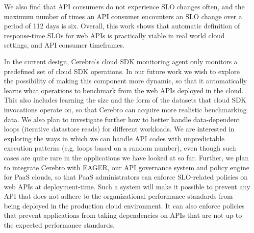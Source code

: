 We also find that API consumers do not experience SLO changes often, and the maximum
number of times an API consumer encounters an SLO change over a period of 112 days is six.
Overall, this work shows that automatic definition of response-time SLOs for web APIs is practically
viable in real world cloud settings, and API consumer timeframes.

In the current design, Cerebro's cloud SDK monitoring agent only monitors 
a predefined set of cloud SDK operations. In our future work we wish 
to explore the possibility of making this component more dynamic,
so that it automatically learns what operations to benchmark from the web APIs 
deployed in the cloud. This also includes learning the size and the form of the datasets
that cloud SDK invocations operate on, so that Cerebro can acquire more realistic
benchmarking data. We also plan to investigate further how to better
handle data-dependent loops (iterative datastore reads) for different workloads. We are interested
in exploring the ways in which we can handle API codes with unpredictable execution patterns (e.g.
loops based on a random number), even though such cases are quite rare in the applications we
have looked at so far.
Further, we plan
to integrate Cerebro with EAGER, our API governance system 
and policy engine for PaaS clouds, so 
that PaaS administrators can enforce SLO-related policies on web APIs at deployment-time.
Such a system will make it possible to prevent any API that 
does not adhere to the organizational performance
standards from being deployed in the production cloud environment. It can 
also enforce policies that prevent applications from taking dependencies on APIs
that are not up to the expected performance standards.